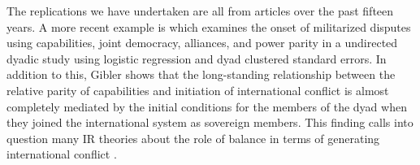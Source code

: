 The replications we have undertaken are all from articles over the past fifteen years.  A more recent example is \citet{gibler:2017} which examines the onset of militarized disputes using capabilities, joint democracy, alliances, and power parity in a undirected dyadic study using logistic regression and dyad clustered standard errors.   In addition to this, Gibler shows that the long-standing relationship between the relative parity of capabilities and initiation of international conflict is almost completely mediated by the initial conditions for the members of the dyad when they joined the international system as sovereign members. This finding calls into question many IR theories about the role of balance in terms of generating international conflict \citep{organski:1958}.


